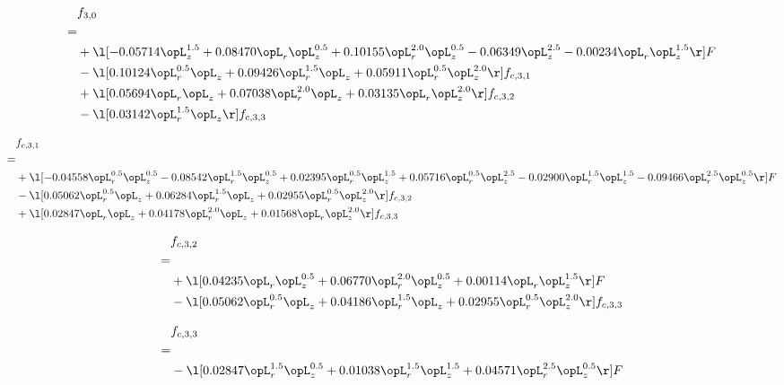 \begin{alignat}{2} 
\label{eq:f_30_2} 
& f_{3,0} \nonumber \\ 
 = \\ 
& + \l[  -0.05714 \opL_z^{1.5} +  0.08470 \opL_r \opL_z^{0.5} +  0.10155 \opL_r^{2.0} \opL_z^{0.5}   -0.06349 \opL_z^{2.5}   -0.00234 \opL_r \opL_z^{1.5}  \r] F \nonumber \\ 
& - \l[  0.10124 \opL_r^{0.5} \opL_z +  0.09426 \opL_r^{1.5} \opL_z +  0.05911 \opL_r^{0.5} \opL_z^{2.0}  \r] f_{c,3,1} \nonumber \\ 
& + \l[  0.05694 \opL_r \opL_z +  0.07038 \opL_r^{2.0} \opL_z +  0.03135 \opL_r \opL_z^{2.0}  \r] f_{c,3,2} \nonumber \\ 
& - \l[  0.03142 \opL_r^{1.5} \opL_z  \r] f_{c,3,3} \nonumber \\ 
\end{alignat} 


\begin{alignat}{2} 
\label{eq:f_31_2} 
& f_{c,3,1} \nonumber \\ 
 = \\ 
& + \l[  -0.04558 \opL_r^{0.5} \opL_z^{0.5}   -0.08542 \opL_r^{1.5} \opL_z^{0.5} +  0.02395 \opL_r^{0.5} \opL_z^{1.5} +  0.05716 \opL_r^{0.5} \opL_z^{2.5}   -0.02900 \opL_r^{1.5} \opL_z^{1.5}   -0.09466 \opL_r^{2.5} \opL_z^{0.5}  \r] F \nonumber \\ 
& - \l[  0.05062 \opL_r^{0.5} \opL_z +  0.06284 \opL_r^{1.5} \opL_z +  0.02955 \opL_r^{0.5} \opL_z^{2.0}  \r] f_{c,3,2} \nonumber \\ 
& + \l[  0.02847 \opL_r \opL_z +  0.04178 \opL_r^{2.0} \opL_z +  0.01568 \opL_r \opL_z^{2.0}  \r] f_{c,3,3} \nonumber \\ 
\end{alignat} 


\begin{alignat}{2} 
\label{eq:f_32_2} 
& f_{c,3,2} \nonumber \\ 
 = \\ 
& + \l[  0.04235 \opL_r \opL_z^{0.5} +  0.06770 \opL_r^{2.0} \opL_z^{0.5} +  0.00114 \opL_r \opL_z^{1.5}  \r] F \nonumber \\ 
& - \l[  0.05062 \opL_r^{0.5} \opL_z +  0.04186 \opL_r^{1.5} \opL_z +  0.02955 \opL_r^{0.5} \opL_z^{2.0}  \r] f_{c,3,3} \nonumber \\ 
\end{alignat} 


\begin{alignat}{2} 
\label{eq:f_33_2} 
& f_{c,3,3} \nonumber \\ 
 = \\ 
& - \l[  0.02847 \opL_r^{1.5} \opL_z^{0.5} +  0.01038 \opL_r^{1.5} \opL_z^{1.5} +  0.04571 \opL_r^{2.5} \opL_z^{0.5}  \r] F \nonumber \\ 
\end{alignat} 


